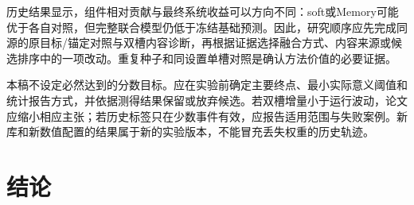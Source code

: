 \documentclass[UTF8,a4paper,zihao=-4,fontset=none]{ctexart}
\begin{document}
历史结果显示，组件相对贡献与最终系统收益可以方向不同：soft或Memory可能优于各自对照，但完整联合模型仍低于冻结基础预测。因此，研究顺序应先完成同源的原目标/锚定对照与双槽内容诊断，再根据证据选择融合方式、内容来源或候选排序中的一项改动。重复种子和同设置单槽对照是确认方法价值的必要证据。

本稿不设定必然达到的分数目标。应在实验前确定主要终点、最小实际意义阈值和统计报告方式，并依据测得结果保留或放弃候选。若双槽增量小于运行波动，论文应缩小相应主张；若历史标签只在少数事件有效，应报告适用范围与失败案例。新库和新数值配置的结果属于新的实验版本，不能冒充丢失权重的历史轨迹。
\section{结论}

\label{sec:conclusion}
\end{document}
